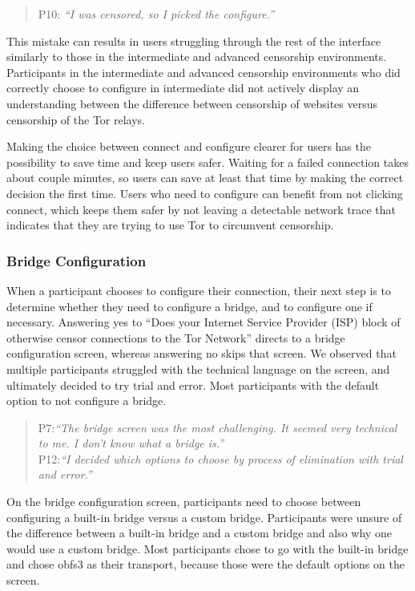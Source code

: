 \documentclass{template}
\begin{document}
\begin{quotation}
\noindent P10: \textit{``I was censored, so I picked the configure.''}
\end{quotation}

This mistake can results in users struggling through the rest of the interface similarly to those in the intermediate and advanced censorship environments. Participants in the intermediate and advanced censorship environments who did correctly choose to configure in intermediate did not actively display an understanding between the difference between censorship of websites versus censorship of the Tor relays. 

Making the choice between connect and configure clearer for users has the possibility to save time and keep users safer. Waiting for a failed connection takes about couple minutes, so users can save at least that time by making the correct decision the first time. Users who need to configure can benefit from not clicking connect, which keeps them safer by not leaving a detectable network trace that indicates that they are trying to use Tor to circumvent censorship.\\

\subsubsection{Bridge Configuration} 
When a participant chooses to configure their connection, their next step is to determine whether they need to configure a bridge, and to configure one if necessary. Answering yes to ``Does your Internet Service Provider (ISP) block of otherwise censor connections to the Tor Network'' directs to a bridge configuration screen, whereas answering no skips that screen. We observed that multiple participants struggled with the technical language on the screen, and ultimately decided to try trial and error. Most participants with the default option to not configure a bridge. 

\begin{quotation}
\noindent P7:\textit{``The bridge screen was the most challenging. It seemed very technical to me. I don't know what a bridge is.''}\\

\noindent P12:\textit{``I decided which options to choose by process of elimination with trial and error.''}
\end{quotation} 

On the bridge configuration screen, participants need to choose between configuring a built-in bridge versus a custom bridge. Participants were unsure of the difference between a built-in bridge and a custom bridge and also why one would use a custom bridge. Most participants chose to go with the built-in bridge and chose obfs3 as their transport, because those were the default options on the screen. 
\end{document}
